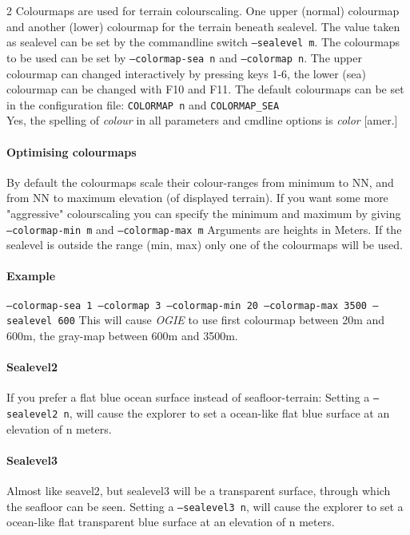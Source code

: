 2 Colourmaps are used for terrain colourscaling. One upper (normal) colourmap and another (lower) colourmap for the terrain beneath sealevel. The value taken as sealevel can be set by the commandline switch \texttt{--sealevel m}. The colourmaps to be used can be set by \texttt{--colormap-sea n} and \texttt{--colormap n}. The upper colourmap can changed interactively by pressing keys 1-6, the lower (sea) colourmap can be changed with F10 and F11.
The default colourmaps can be set in the configuration file:
\texttt{COLORMAP n} and \texttt{COLORMAP\_SEA}
\\
Yes, the spelling of \emph{colour} in all parameters and cmdline options is \emph{color} [amer.]

\paragraph{Optimising colourmaps}
By default the colourmaps scale their colour-ranges from minimum to NN,
and from NN to maximum elevation (of displayed terrain).
If you want some more "aggressive" colourscaling you can
specify the minimum and maximum by giving \texttt{--colormap-min m} and \texttt{--colormap-max m}
Arguments are heights in Meters.
If the sealevel is outside the range (min, max) only one of the colourmaps will
be used.

\paragraph{Example}
\texttt{--colormap-sea 1 --colormap 3 --colormap-min 20 --colormap-max 3500 --sealevel 600}
This will cause \emph{OGIE} to use first colourmap between 20m and 600m, the gray-map between 600m and 3500m.

\paragraph{Sealevel2}
If you prefer a flat blue ocean surface instead of seafloor-terrain:
Setting a \texttt{--sealevel2 n}, will cause the explorer to set a ocean-like flat blue
surface at an elevation of n meters.

\paragraph{Sealevel3}
Almost like seavel2, but sealevel3 will be a transparent surface, through which the seafloor can be seen.
Setting a \texttt{--sealevel3 n}, will cause the explorer to set a ocean-like flat transparent blue
surface at an elevation of n meters.



